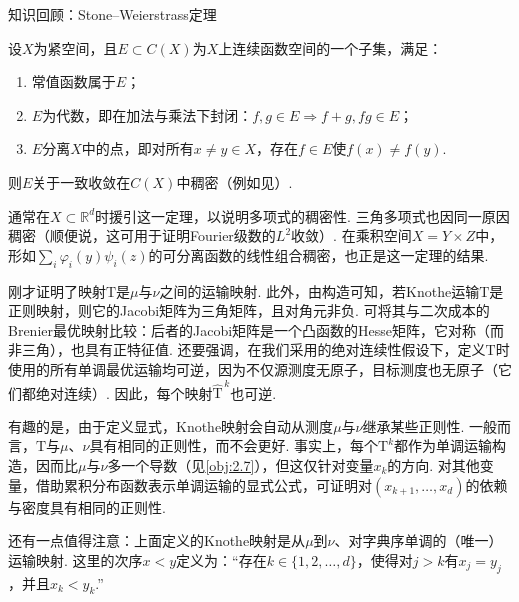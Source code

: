 \begin{sourcebox}{知识回顾：Stone--Weierstrass定理}\label{box:2.3}
\begin{theorem*}
设$X$为紧空间，且$E\subset C(X)$为$X$上连续函数空间的一个子集，满足：
\begin{enumerate}
\item[i)] 常值函数属于$E$；
\item[ii)] $E$为代数，即在加法与乘法下封闭：$f,g\in E\Rightarrow f+g,fg\in E$；
\item[iii)] $E$分离$X$中的点，即对所有$x\ne y\in X$，存在$f\in E$使$f(x)\ne f(y)$.
\end{enumerate}
则$E$关于一致收敛在$C(X)$中稠密（例如见\cite{b268}）.
\end{theorem*}
通常在$X\subset\mathbb R^d$时援引这一定理，以说明多项式的稠密性. 三角多项式也因同一原因稠密（顺便说，这可用于证明Fourier级数的$L^2$收敛）. 在乘积空间$X=Y\times Z$中，形如$\sum_i\varphi_i(y)\psi_i(z)$的可分离函数的线性组合稠密，也正是这一定理的结果.
\end{sourcebox}

刚才证明了映射$\mathrm T$是$\mu$与$\nu$之间的运输映射. 此外，由构造可知，若Knothe运输$\mathrm T$是正则映射，则它的Jacobi矩阵为三角矩阵，且对角元非负. 可将其与二次成本的Brenier最优映射比较：后者的Jacobi矩阵是一个凸函数的Hesse矩阵，它对称（而非三角），也具有正特征值. 还要强调，在我们采用的绝对连续性假设下，定义$\mathrm T$时使用的所有单调最优运输均可逆，因为不仅源测度无原子，目标测度也无原子（它们都绝对连续）. 因此，每个映射$\widehat{\mathrm T}^{\,k}$也可逆.

\begin{remark}\label{obj:2.19}
有趣的是，由于定义显式，Knothe映射会自动从测度$\mu$与$\nu$继承某些正则性. 一般而言，$\mathrm T$与$\mu$、$\nu$具有相同的正则性，而不会更好. 事实上，每个$\mathrm T^k$都作为单调运输构造，因而比$\mu$与$\nu$多一个导数（见\autoref{obj:2.7}），但这仅针对变量$x_k$的方向. 对其他变量，借助累积分布函数表示单调运输的显式公式，可证明对$(x_{k+1},\ldots,x_d)$的依赖与密度具有相同的正则性.
\end{remark}

\begin{remark}\label{obj:2.20}
还有一点值得注意：上面定义的Knothe映射是从$\mu$到$\nu$、对字典序单调的（唯一）运输映射. 这里的次序$x<y$定义为：“存在$k\in\{1,2,\ldots,d\}$，使得对$j>k$有$x_j=y_j$，并且$x_k<y_k$.”
\end{remark}

